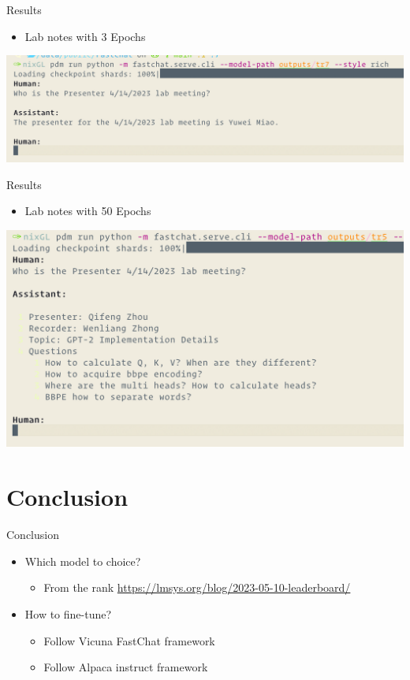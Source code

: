 \documentclass[aspectratio=1610,xcolor={dvipsnames},hyperref={colorlinks,unicode,linkcolor=violet,anchorcolor=BlueViolet,citecolor=YellowOrange,filecolor=black,urlcolor=Aquamarine}]{beamer}
\begin{document}
\begin{frame}[label={sec:org5a02397}]{Results}
\begin{itemize}
\item Lab notes with 3 Epochs
\end{itemize}

\begin{center}
\includegraphics[width=.9\linewidth]{./p9.png}
\end{center}
\end{frame}

\begin{frame}[label={sec:org4bd3acc}]{Results}
\begin{itemize}
\item Lab notes with 50 Epochs
\end{itemize}

\begin{center}
\includegraphics[width=.9\linewidth]{./p10.png}
\end{center}
\end{frame}

\section{Conclusion}
\label{sec:org9410369}

\begin{frame}[label={sec:org29e2279}]{Conclusion}
\begin{itemize}
\item Which model to choice?
\begin{itemize}
\item From the rank \url{https://lmsys.org/blog/2023-05-10-leaderboard/}
\end{itemize}
\item How to fine-tune?
\begin{itemize}
\item Follow Vicuna FastChat framework
\item Follow Alpaca instruct framework
\end{itemize}
\end{itemize}
\end{frame}
\end{document}
